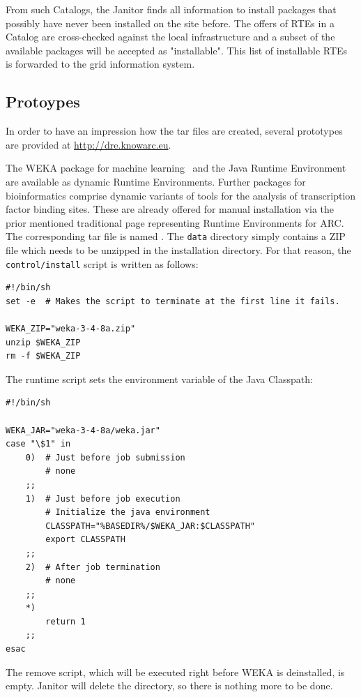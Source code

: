 From such Catalogs, the Janitor finds all information to install
packages that possibly have never been installed on the site before. The
offers of RTEs in a Catalog are cross-checked against the local
infrastructure and a subset of the available packages will be accepted as
"installable". This list of installable RTEs is forwarded to the grid
information system.

\subsection{Protoypes}

In order to have an impression how the tar files are created, several
prototypes are provided at \url{http://dre.knowarc.eu}.

The WEKA package for machine learning~\cite{FRANK_20074} and the Java
Runtime Environment are available as dynamic Runtime Environments. Further
packages for bioinformatics comprise dynamic variants of tools for
the analysis of transcription factor binding sites. These are already
offered for manual installation via the prior mentioned traditional page
representing Runtime Environments for ARC.  The corresponding tar file
is named . The \texttt{data} directory simply contains
a ZIP file which needs to be unzipped in the installation directory. For
that reason, the \texttt{control/install} script is written as follows:

\begin{verbatim} 
#!/bin/sh
set -e  # Makes the script to terminate at the first line it fails.

WEKA_ZIP="weka-3-4-8a.zip"
unzip $WEKA_ZIP
rm -f $WEKA_ZIP
\end{verbatim}
The runtime script sets the environment variable of the Java Classpath:
\begin{verbatim}
#!/bin/sh

WEKA_JAR="weka-3-4-8a/weka.jar"
case "\$1" in
	0)	# Just before job submission
		# none
	;;
	1)	# Just before job execution
		# Initialize the java environment
		CLASSPATH="%BASEDIR%/$WEKA_JAR:$CLASSPATH"
		export CLASSPATH
	;;
	2)	# After job termination
		# none
	;;
	*)
		return 1
	;;
esac	
\end{verbatim}

The remove script, which will be executed right before WEKA is deinstalled, is empty.
Janitor will delete the directory, so there is nothing more to be done.

